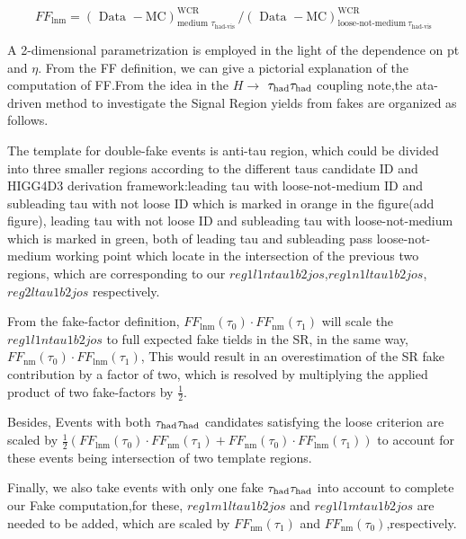 \begin{equation}
F F_{\mathrm{lnm}}=(\text { Data }-\mathrm{MC})_{\text {medium } \tau_{\text {had-vis }}}^{\mathrm{WCR}} /(\text { Data }-\mathrm{MC})_{\text {loose-not-medium}\ \tau_{\text{had-vis}}}^{\mathrm{WCR}}
\end{equation}

A 2-dimensional parametrization is employed in the light of the dependence on pt and $\eta$. From the FF definition, we can give a pictorial explanation of the computation of FF.From the idea in the $H\rightarrow$ $\tau_\text{had}{}\tau_\text{had}$ coupling note,the ata-driven method to investigate the Signal Region yields from fakes are organized as follows.

The template for double-fake events is anti-tau region, which could be divided into three smaller regions according to the different taus candidate ID and HIGG4D3 derivation framework:leading tau with loose-not-medium ID and subleading tau with not loose ID which is marked in orange in the figure(add figure), leading tau with not loose ID and subleading tau with loose-not-medium which is marked in green, both of leading tau and subleading pass loose-not-medium working point which locate in the intersection of the previous two regions, which are corresponding to our $reg1l1ntau1b2jos$,$reg1n1ltau1b2jos$,$reg2ltau1b2jos$ respectively.

From the fake-factor definition, $F F_{\operatorname{lnm}}\left(\tau_{0}\right) \cdot F F_{\mathrm{nm}}\left(\tau_{1}\right)$ will scale the $reg1l1ntau1b2jos$ to full expected fake tields in the SR,  in the same way, $F F_{\mathrm{nm}}\left(\tau_{0}\right) \cdot F F_{\mathrm{lnm}}\left(\tau_{1}\right)$, This would result in an overestimation of the SR fake contribution by a factor of two, which is resolved by multiplying the applied product of two fake-factors by $\frac{1}{2}$.

Besides, Events with both $\tau_\text{had}{}\tau_\text{had}$ candidates satisfying the loose criterion are scaled 
by $\frac{1}{2}\left(F F_{\operatorname{lnm}}\left(\tau_{0}\right) \cdot F F_{\mathrm{nm}}\left(\tau_{1}\right)+F F_{\mathrm{nm}}\left(\tau_{0}\right) \cdot F F_{\operatorname{lnm}}\left(\tau_{1}\right)\right)$ to account for these events being intersection of two template regions.

Finally, we also take events with only one fake $\tau_\text{had}{}\tau_\text{had}$ into account to complete our Fake computation,for these, $reg1m1ltau1b2jos$ and $reg1l1mtau1b2jos$ are needed to be added, which are scaled by $F F_{\mathrm{nm}}\left(\tau_{1}\right)$ and $F F_{\mathrm{nm}}\left(\tau_{0}\right)$,respectively.

